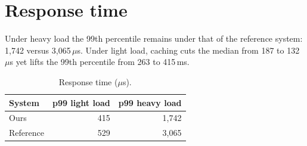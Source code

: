 \documentclass{article}
\begin{document}
\section{Response time}
Under heavy load the 99th percentile remains under that of the reference system: 1,742 versus 3,065\,$\mu$s. Under light load, caching cuts the median from 187 to 132\,$\mu$s yet lifts the 99th percentile from 263 to 415\,ms.
\begin{table}[h]\centering\caption{Response time ($\mu$s).}
\begin{tabular}{lrr}
\toprule
System & p99 light load & p99 heavy load \\
\midrule
Ours & 415 & 1,742 \\
Reference & 529 & 3,065 \\
\bottomrule
\end{tabular}\end{table}
\end{document}
